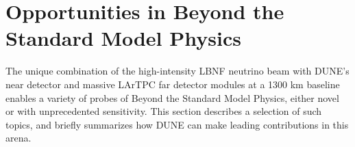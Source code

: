 \section{Opportunities in Beyond the Standard Model Physics}
\label{sec:exec-summ-physics-bsm}
The unique combination of the high-intensity LBNF neutrino beam with DUNE's near detector and massive LArTPC far detector modules at a 1300 km baseline enables a variety of probes of Beyond the Standard Model Physics, either novel or with unprecedented sensitivity. This section describes a selection of such topics, and briefly summarizes how DUNE can make leading contributions in this arena.

